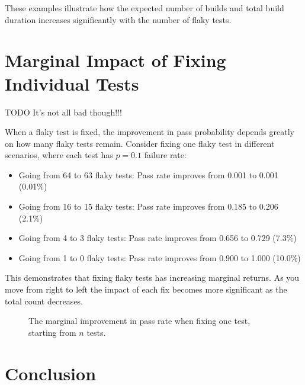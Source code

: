 \documentclass[letterpaper]{article}
\begin{document}
These examples illustrate how the expected number of builds and total build duration increases significantly with the number of flaky tests.



\section*{Marginal Impact of Fixing Individual Tests}

TODO It's not all bad though!!! 

When a flaky test is fixed, the improvement in pass probability depends greatly on how many flaky tests remain. Consider fixing one flaky test in different scenarios, where each test has $p=0.1$ failure rate:

\begin{itemize}
    \item Going from 64 to 63 flaky tests: Pass rate improves from 0.001 to 0.001 (0.01\%)
    \item Going from 16 to 15 flaky tests: Pass rate improves from 0.185 to 0.206 (2.1\%)
    \item Going from 4 to 3 flaky tests: Pass rate improves from 0.656 to 0.729 (7.3\%)
    \item Going from 1 to 0 flaky tests: Pass rate improves from 0.900 to 1.000 (10.0\%)
\end{itemize}

This demonstrates that fixing flaky tests has increasing marginal returns. As you move from right to left the impact of each fix becomes more significant as the total count decreases.

\begin{figure}[h!]
    \centering
    \caption{The marginal improvement in pass rate when fixing one test, starting from $n$ tests.}
\end{figure}

\section*{Conclusion}
\end{document}
